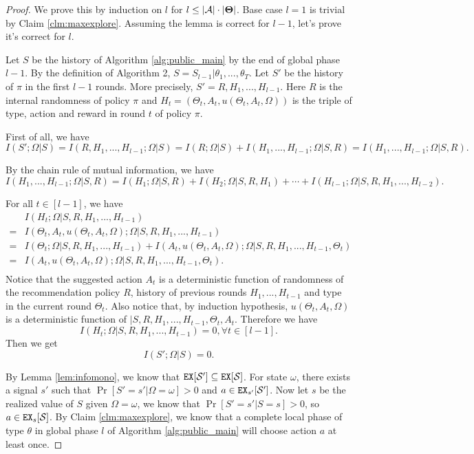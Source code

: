 \begin{proof}
We prove this by induction on $l$ for $l \leq |\mathcal{A}|\cdot |\bold{\Theta}|$. Base case $l=1$ is trivial by Claim \ref{clm:maxexplore}. Assuming the lemma is correct for $l-1$, let's prove it's correct for $l$.

Let $S$ be the history of Algorithm \ref{alg:public_main} by the end of global phase $l-1$. By the definition of Algorithm 2, $S = S_{l-1} | \theta_1,...,\theta_T$.  Let $S'$ be the history of $\pi$ in the first $l-1$ rounds. More precisely, $S' = R, H_1,...,H_{l-1}$. Here $R$ is the internal randomness of policy $\pi$ and $H_t = (\Theta_t, A_t, u(\Theta_t, A_t, \Omega))$ is the triple of type, action and reward in round $t$ of policy $\pi$.

First of all, we have
\[
I(S'; \Omega| S) = I(R,H_1,...,H_{l-1}; \Omega| S)  = I(R; \Omega| S) + I(H_1,...,H_{l-1}; \Omega|S, R) = I(H_1,...,H_{l-1}; \Omega|S, R).
\]

By the chain rule of mutual information, we have
\[
 I(H_1,...,H_{l-1}; \Omega|S, R) = I(H_1;\Omega|S,R) + I(H_2;\Omega|S, R ,H_1) + \cdots + I(H_{l-1}; \Omega|S,R,H_1,...,H_{l-2}).
\]

For all $t \in [l-1]$, we have
\begin{align*}
&I(H_t; \Omega|S,R,H_1,...,H_{t-1}) \\
=& I(\Theta_t, A_t, u(\Theta_t, A_t, \Omega); \Omega|S,R,H_1,...,H_{t-1}) \\
=& I(\Theta_t ; \Omega|S,R,H_1,...,H_{t-1}) +  I(A_t, u(\Theta_t, A_t, \Omega); \Omega|S,R,H_1,...,H_{t-1},\Theta_t) \\
=& I(A_t, u(\Theta_t, A_t, \Omega); \Omega|S,R,H_1,...,H_{t-1},\Theta_t). \\
\end{align*}
Notice that the suggested action $A_t$ is a deterministic function of randomness of the recommendation policy $R$,  history of previous rounds $H_1,...,H_{t-1}$ and type in the current round $\Theta_t$. Also notice that, by induction hypothesis, $u(\Theta_t, A_t, \Omega)$ is a deterministic function of $|S,R,H_1,...,H_{t-1},\Theta_t, A_t$. Therefore we have
\[
I(H_t; \Omega|S,R,H_1,...,H_{t-1}) = 0, \forall t \in [l-1].
\]
Then we get
\[
I(S'; \Omega | S) = 0.
\]

By Lemma \ref{lem:infomono}, we know that $\mathtt{EX}[\mathcal{S}'] \subseteq \mathtt{EX}[\mathcal{S}]$. For state $\omega$, there exists a signal $s'$ such that $\Pr[S'=s'|\Omega =\omega] >0 $ and $a \in \mathtt{EX}_{s'} [\mathcal{S}']$. Now let $s$ be the realized value of $S$ given $\Omega = \omega$, we know that $\Pr[S'=s'|S=s] >0$, so $a \in \mathtt{EX}_s[\mathcal{S}]$. By Claim \ref{clm:maxexplore}, we know that a complete local phase of type $\theta$ in global phase $l$ of Algorithm \ref{alg:public_main} will choose action $a$ at least once.


\end{proof}
